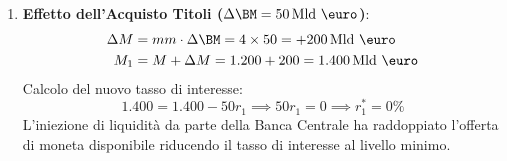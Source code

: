 \begin{esercizio}
\begin{enumerate}
    \item \textbf{Effetto dell'Acquisto Titoli ($\Delta \BM = 50\,\text{Mld \euro}$)}:
    \begin{align*}
        \Delta M &= mm \cdot \Delta \BM = 4 \times 50 = +200\,\text{Mld \euro} \\
        M_1 &= M + \Delta M = 1.200 + 200 = 1.400\,\text{Mld \euro}
    \end{align*}
    Calcolo del nuovo tasso di interesse:
    \begin{equation*}
        1.400 = 1.400 - 50 r_1 \implies 50 r_1 = 0 \implies r_1^* = 0\%
    \end{equation*}
    L'iniezione di liquidità da parte della Banca Centrale ha raddoppiato l'offerta di moneta disponibile riducendo il tasso di interesse al livello minimo.
\end{enumerate}
\end{esercizio}
